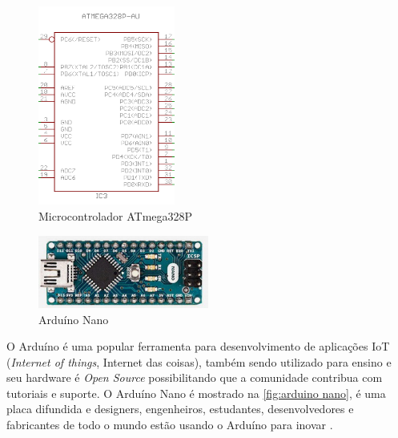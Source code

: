    \begin{figure}[h!]
              \caption{\label{fig:ATmega}{Microcontrolador ATmega328P}}
              \centering
              \includegraphics[width=0.4\textwidth]{Figuras/atmega.PNG}
    \end{figure}
    \begin{figure}[h!]
              \caption{\label{fig:arduino nano}{Arduíno Nano}}
              \centering
              \includegraphics[width=0.5\textwidth]{Figuras/arduino_nano.png}
    \end{figure}
    \par
    O Arduíno é uma popular ferramenta para desenvolvimento de aplicações IoT (\textit{Internet of things}, Internet das coisas), também sendo utilizado para ensino e seu hardware é \textit{Open Source} possibilitando que a comunidade contribua com tutoriais e suporte. O Arduíno Nano é mostrado na \autoref{fig:arduino nano}, é uma placa difundida e designers, engenheiros, estudantes, desenvolvedores e fabricantes de todo o mundo estão usando o Arduíno para inovar \cite{arduino}.
    
%  

